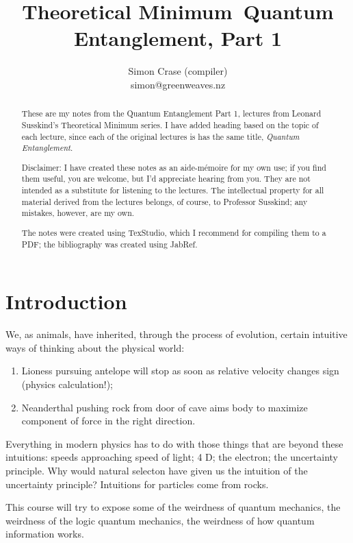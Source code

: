 \documentclass[]{article}
\title{Theoretical Minimum\ Quantum Entanglement, Part 1}
\author{Simon Crase (compiler)\\simon@greenweaves.nz}
\begin{document}
\maketitle

\begin{abstract}
These are my notes from the Quantum Entanglement Part 1, lectures\cite{susskind2013entanglement}  from Leonard Susskind's Theoretical Minimum series\cite{susskind2007theoretical}. I have added heading based on the topic of each lecture, since each of the original lectures is has the same title, \emph{Quantum Entanglement}.

Disclaimer: I have created these notes as an aide-m\'emoire for my own use; if you find them useful, you are welcome, but I'd appreciate hearing from you. They are not intended 
as a substitute for listening to the lectures. The intellectual property for all material derived from the lectures belongs, of course, to Professor Susskind; any mistakes, however, are my own.

The notes were created using TexStudio\cite{TexStudio}, which I recommend for compiling them to a PDF; the bibliography was created using JabRef\cite{Jabref}.

\end{abstract}

\tableofcontents
\listoffigures
\listoftables
\listoftheorems


\section{Introduction}


We, as animals, have inherited, through the process of evolution, certain intuitive ways of thinking about the physical world:
\begin{enumerate}
	\item Lioness pursuing antelope will stop as soon as relative velocity changes sign (physics calculation!);
	\item Neanderthal pushing rock from door of cave aims body to maximize component of force in the right direction.
\end{enumerate}

Everything in modern physics has to do with those things that are beyond these intuitions:
speeds approaching speed of light; 4 D; the electron; the uncertainty principle. Why would natural selecton have given us the intuition of the uncertainty principle? Intuitions for particles come from rocks.

This course will try to expose some of the weirdness of quantum mechanics, the weirdness of the logic quantum mechanics, the weirdness of how quantum information works. 
\end{document}
